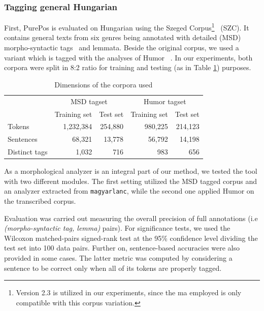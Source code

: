 \subsubsection{Tagging general Hungarian}\label{sec:porepos-gen}

First, PurePos is evaluated on Hungarian using the Szeged Corpus\footnote{Version 2.3 is utilized in our experiments, since the \acrshort{ma} employed is only compatible with this corpus variation.}~\cite{Csendes2004} (SZC). 
It contains general texts from six genres being annotated with detailed (MSD) morpho-syntactic tags~\cite{Erjavec2012} and lemmata. %
Beside the original corpus, we used a variant which is tagged with the analyses of Humor ~\cite{Proszeky1994,Novak2003,Proszeky2005}. 
In our experiments, both corpora were split in 8:2 ratio for training and testing (as in Table \ref{tab:szeged-corpus}) purposes. 

\begin{table}[H]
\centering
\caption{Dimensions of the corpora used}
\begin{tabular}{l r r r r}
  \hline
  & \multicolumn{2}{c}{MSD tagset} & \multicolumn{2}{c}{Humor tagset} \\
  &  Training set &  Test set &  Training set &  Test set  \\
  \hline
  Tokens &  1,232,384 &  254,880 &  980,225 &  214,123 \\
  Sentences &  68,321 &  13,778 &  56,792 &  14,198 \\
  Distinct tags &  1,032 &  716 &  983 &  656 \\
  \hline
\end{tabular}
\label{tab:szeged-corpus}
\end{table}

As a morphological analyzer is an integral part of our method, we tested the tool with two different modules. 
The first setting utilized the MSD tagged corpus and an analyzer extracted from \texttt{magyarlanc}, while the second one applied Humor on the transcribed corpus.

Evaluation was carried out measuring the overall precision of full annotations (i.e \emph{(morpho-syntactic tag, lemma)} pairs). 
For significance tests, we used the Wilcoxon matched-pairs signed-rank test at the 95\% confidence level dividing the test set into 100 data pairs.
Further on, sentence-based accuracies were also provided in some cases. 
The latter metric was computed by considering a sentence to be correct only when all of its tokens are properly tagged. 

